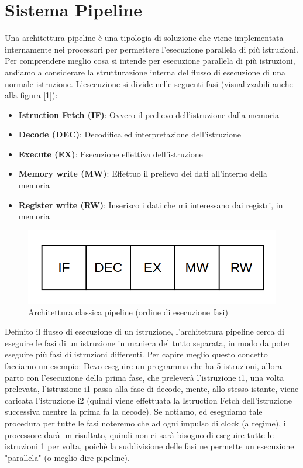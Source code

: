 \newpage
\section{Sistema Pipeline}
Una architettura pipeline è una tipologia di soluzione che viene implementata internamente nei processori per permettere l'esecuzione parallela di più istruzioni.
Per comprendere meglio cosa si intende per esecuzione parallela di più istruzioni, andiamo a considerare la strutturazione interna del flusso di esecuzione di una normale istruzione. L'esecuzione si divide nelle seguenti fasi (visualizzabili anche alla figura [\ref{img:pipe}]):
\begin{itemize}
    \item \textbf{Istruction Fetch (IF)}: Ovvero il prelievo dell'istruzione dalla memoria
    \item \textbf{Decode (DEC)}: Decodifica ed interpretazione dell'istruzione
    \item \textbf{Execute (EX)}: Esecuzione effettiva dell'istruzione
    \item \textbf{Memory write (MW)}: Effettuo il prelievo dei dati all'interno della memoria
    \item \textbf{Register write (RW)}: Inserisco i dati che mi interessano dai registri, in memoria 
\end{itemize}

\begin{figure}
    \centering
    \includegraphics[width=.5\textwidth]{img/Pipeline.png}
    \caption{Architettura classica pipeline (ordine di esecuzione fasi)}\label{img:pipe}
\end{figure}

Definito il flusso di esecuzione di un istruzione, l'architettura pipeline cerca di eseguire le fasi di un istruzione in maniera del tutto separata, in modo da poter eseguire più fasi di istruzioni differenti. Per capire meglio questo concetto facciamo un esempio:
Devo eseguire un programma che ha 5 istruzioni, allora parto con l'esecuzione della prima fase, che preleverà l'istruzione i1, una volta prelevata, l'istruzione i1 passa alla fase di decode, mente, allo stesso istante, viene caricata l'istruzione i2 (quindi viene effettuata la Istruction Fetch dell'istruzione successiva mentre la prima fa la decode). Se notiamo, ed eseguiamo tale procedura per tutte le fasi noteremo che ad ogni impulso di clock (a regime), il processore darà un risultato, quindi non ci sarà bisogno di eseguire tutte le istruzioni 1 per volta, poichè la suddivisione delle fasi ne permette un esecuzione "parallela" (o meglio dire pipeline).

